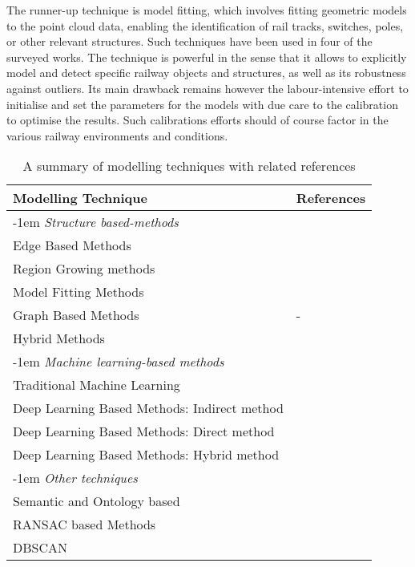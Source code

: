 The runner-up technique is model fitting, which involves fitting geometric models to the point cloud data, enabling the identification of rail tracks, switches, poles, or other relevant structures. Such techniques have been used in four of the surveyed works. The technique is powerful in the sense that it allows to explicitly model and detect specific railway objects and structures, as well as its robustness against outliers. Its main drawback remains however the labour-intensive effort to initialise and set the parameters for the models with due care to the calibration to optimise the results. Such calibrations efforts should of course factor in the various railway environments and conditions.

\begin{table}[ht!]
    \centering
    \begin{tabular}{ll}\toprule
    \textbf{Modelling Technique} & \textbf{References}\\ \midrule
         \kern-1em \textit{Structure based-methods}\\
         Edge Based Methods &   \cite{ariyachandra2020detection} \\
         Region Growing methods & \cite{cserep2022effective,arastounia2017enhanced,chbeir2015detection} \\
         Model Fitting Methods & \cite{arastounia2016application,ariyachandra2020digital,benhmida2011from,cserep2022effective} \\
         Graph Based Methods  &  - \\
         Hybrid Methods & \cite{arastounia2016application,ariyachandra2020detection,ariyachandra2020digital,chbeir2015detection,Karunathilake20} \\
         \addlinespace
         \kern-1em \textit{Machine learning-based methods}\\
         Traditional Machine Learning & 
         \cite{sturari2017robotic,uggla2021towards}\\     
         Deep Learning Based Methods: Indirect method & \cite{corongiu2020classification,lin2020lidar,manier2022railway,yu2022real-time} \\ 
         Deep Learning Based Methods: Direct method & \cite{chen2020deep,dibari2021semantic,grandio2022point} \\
         Deep Learning Based Methods: Hybrid method & \cite{liu2021an} \\
         \addlinespace
         \kern-1em \textit{Other techniques}\\
         Semantic and Ontology based  & \cite{karmacharya2015knowledge}\\
         RANSAC based Methods &  \cite{oudeelberink2013rail,pastucha2016catenary} \\
         DBSCAN & \cite{lu2021bolt}\\ \bottomrule         
    \end{tabular}
    \caption{A summary of modelling techniques with related references}
    \label{tab:stoa:modelling}
\end{table}

